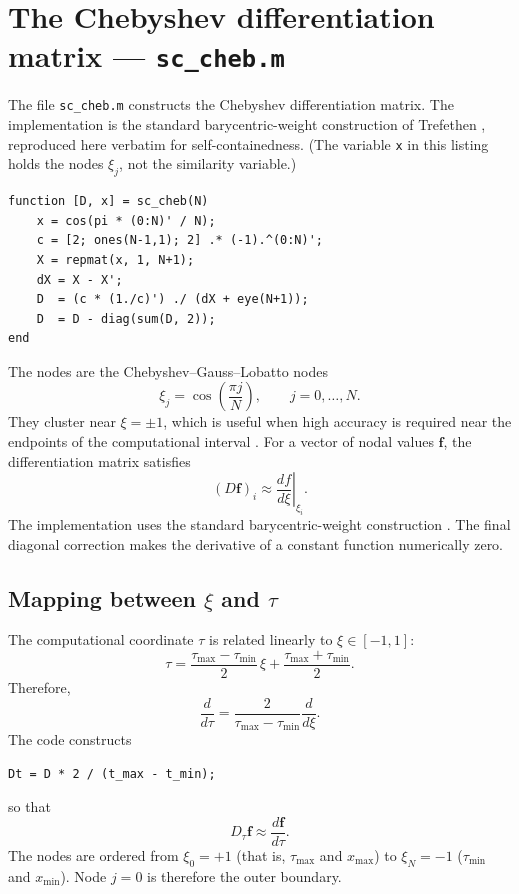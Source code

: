 \documentclass[11pt,a4paper]{article}
\begin{document}
\section{The Chebyshev differentiation matrix --- \texttt{sc\_cheb.m}}
\label{sec:cheb}
The file \texttt{sc\_cheb.m} constructs the Chebyshev differentiation
matrix. The implementation is the standard barycentric-weight construction
of Trefethen \cite[Program~6]{trefethen2000}, reproduced here verbatim for
self-containedness. (The variable
\texttt{x} in this listing holds the nodes $\xi_j$, not the similarity
variable.)
\begin{lstlisting}[style=matlab]
function [D, x] = sc_cheb(N)
    x = cos(pi * (0:N)' / N);
    c = [2; ones(N-1,1); 2] .* (-1).^(0:N)';
    X = repmat(x, 1, N+1);
    dX = X - X';
    D  = (c * (1./c)') ./ (dX + eye(N+1));
    D  = D - diag(sum(D, 2));
end
\end{lstlisting}
The nodes are the Chebyshev--Gauss--Lobatto nodes
\begin{equation}
\xi_j=\cos\left(\frac{\pi j}{N}\right),
\qquad
j=0,\ldots,N.
\label{eq:cgl}
\end{equation}
They cluster near $\xi=\pm1$, which is useful when high accuracy is
required near the endpoints of the computational interval
\cite{trefethen2000,boyd2001}. For a vector of nodal values
$\mathbf f$, the differentiation matrix satisfies
\begin{equation}
(D\mathbf f)_i
\approx
\left.\frac{df}{d\xi}\right|_{\xi_i}.
\label{eq:Dxi}
\end{equation}
The implementation uses the standard barycentric-weight construction
\cite[Ch.~6]{trefethen2000}. The final diagonal correction makes the
derivative of a constant function numerically zero.

\subsection{Mapping between $\xi$ and $\tau$}
The computational coordinate $\tau$ is related linearly to
$\xi\in[-1,1]$:
\begin{equation}
\tau=
\frac{\tau_{\max}-\tau_{\min}}{2}\,\xi
+
\frac{\tau_{\max}+\tau_{\min}}{2}.
\end{equation}
Therefore,
\begin{equation}
\frac{d}{d\tau}
=
\frac{2}{\tau_{\max}-\tau_{\min}}\frac{d}{d\xi}.
\label{eq:dt}
\end{equation}
The code constructs
\begin{lstlisting}[style=matlab]
Dt = D * 2 / (t_max - t_min);
\end{lstlisting}
so that
\begin{equation}
D_\tau\mathbf f
\approx
\frac{d\mathbf f}{d\tau}.
\label{eq:Dt}
\end{equation}
The nodes are ordered from $\xi_0=+1$ (that is, $\tau_{\max}$ and
$x_{\max}$) to $\xi_N=-1$ ($\tau_{\min}$ and $x_{\min}$). Node $j=0$
is therefore the outer boundary.
\end{document}

